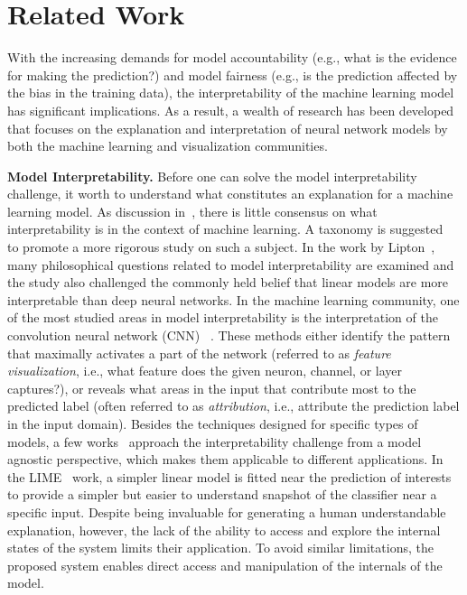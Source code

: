
\section{Related Work}
With the increasing demands for model accountability (e.g., what is the evidence for making the prediction?) and model fairness (e.g., is the prediction affected by the bias in the training data),
the interpretability of the machine learning model has significant implications. As a result, a wealth of research has been developed that focuses on the explanation and interpretation of neural network models by both the machine learning and visualization communities.

\textbf{Model Interpretability.}
Before one can solve the model interpretability challenge, it worth to understand what constitutes an explanation for a machine learning model.
As discussion in~\cite{Lipton2016, Doshi-Velez2017}, there is little consensus on what interpretability is in the context of machine learning. A taxonomy is suggested~\cite{Doshi-Velez2017} to promote a more rigorous study on such a subject. In the work by Lipton~\cite{Lipton2016}, many philosophical questions related to model interpretability are examined and the study also challenged the commonly held belief that linear models are more interpretable than deep neural networks.
%
In the machine learning community, one of the most studied areas in model interpretability is the interpretation of the convolution neural network (CNN) ~\cite{SimonyanVedaldiZisserman2013, ZeilerFergus2014, YosinskiCluneNguyen2015, OlahMordvintsevSchubert2017, OlahSatyanarayanJohnson2018}.
%
These methods either identify the pattern that maximally activates a part of the network (referred to as \emph{feature visualization}, i.e., what feature does the given neuron, channel, or layer captures?), or reveals what areas in the input that contribute most to the predicted label (often referred to as \emph{attribution}, i.e., attribute the prediction label in the input domain).
%
Besides the techniques designed for specific types of models, a few works~\cite{RibeiroSinghGuestrin2016, KrausePererNg2016, LundbergLee2017} approach the interpretability challenge from a model agnostic perspective, which makes them applicable to different applications. In the LIME~\cite{RibeiroSinghGuestrin2016} work, a simpler linear model is fitted near the prediction of interests to provide a simpler but easier to understand snapshot of the classifier near a specific input.
%
Despite being invaluable for generating a human understandable explanation, however, the lack of the ability to access and explore the internal states of the system limits their application. 
To avoid similar limitations, the proposed system enables direct access and manipulation of the internals of the model.

